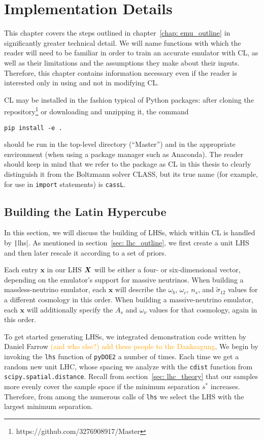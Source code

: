 \chapter{Implementation Details}
\label{chap: implementation}

This chapter covers the steps outlined in chapter~\ref{chap: emu_outline} in
significantly greater technical detail. We will name functions with which the
reader will need to be familiar in order to train an accurate emulator with
CL, as well as their limitations and the assumptions they make about their
inputs. Therefore, this chapter contains information necessary even if the
reader is interested only in using and not in modifying CL.

CL may be installed in the fashion typical of Python packages: after cloning
the repository\footnote{https://github.com/3276908917/Master}
or downloading and unzipping it, the command

\verb|pip install -e .|

should be run in the top-level directory (``Master'') and in the
appropriate environment (when using a package manager such as Anaconda).
The reader should keep in mind that we refer to the package as CL in this
thesis to clearly distinguish it from the Boltzmann solver CLASS, but its
true name (for example, for use in \texttt{import} statements) is
\texttt{cassL}.

\section{Building the Latin Hypercube}
\label{sec: build_lhc}


In this section, we will discuss the building of LHSs, which within CL is 
handled by \texttt|lhs|. As mentioned in section~\ref{sec: lhc_outline},
we first create a unit LHS and then later rescale it according to a set of
priors.

Each entry $\bm{x}$ in our LHS $\bm{X}$ will be either a four- or
six-dimensional vector, 
depending on the emulator's support for massive neutrinos. When building a
massless-neutrino emulator, each $\bm{x}$ will describe the $\omega_b$,
$\omega_c$, $n_s$, and
$\tilde{\sigma}_{12}$ values for a different cosmology in 
this order. When building a massive-neutrino emulator, each $\bm{x}$ will 
additionally specify the $A_s$ and $\omega_\nu$ values for that cosmology, 
again in this order.

To get started generating LHSs, we integrated demonstration code written by 
Daniel Farrow \textcolor{orange}{(and who else?) add these people to the 
Danksagung}. We begin by invoking the \texttt{lhs} function of
\texttt{pyDOE2} a number of times. Each time we get a random new unit LHC, 
whose spacing we analyze with the \texttt{cdist} function from
\texttt{scipy.spatial.distance}.
Recall from section~\ref{sec: lhc_theory} that
our samples more evenly cover the sample space if the minimum separation
$s^*$ increases. Therefore, from among the numerous calls of \texttt{lhs} we 
select the LHS with the largest minimum separation.


